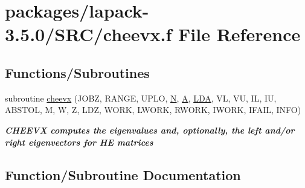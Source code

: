 \hypertarget{cheevx_8f}{}\section{packages/lapack-\/3.5.0/\+S\+R\+C/cheevx.f File Reference}
\label{cheevx_8f}
\subsection*{Functions/\+Subroutines}
\begin{DoxyCompactItemize}
\item 
subroutine \hyperlink{cheevx_8f_a9f7c713a0119e777afe726e54feb6ef7}{cheevx} (J\+O\+B\+Z, R\+A\+N\+G\+E, U\+P\+L\+O, \hyperlink{polmisc_8c_a0240ac851181b84ac374872dc5434ee4}{N}, \hyperlink{classA}{A}, \hyperlink{example__user_8c_ae946da542ce0db94dced19b2ecefd1aa}{L\+D\+A}, V\+L, V\+U, I\+L, I\+U, A\+B\+S\+T\+O\+L, M, W, Z, L\+D\+Z, W\+O\+R\+K, L\+W\+O\+R\+K, R\+W\+O\+R\+K, I\+W\+O\+R\+K, I\+F\+A\+I\+L, I\+N\+F\+O)
\begin{DoxyCompactList}\small\item\em {\bfseries  C\+H\+E\+E\+V\+X computes the eigenvalues and, optionally, the left and/or right eigenvectors for H\+E matrices} \end{DoxyCompactList}\end{DoxyCompactItemize}


\subsection{Function/\+Subroutine Documentation}
\hypertarget{cheevx_8f_a9f7c713a0119e777afe726e54feb6ef7}{}
